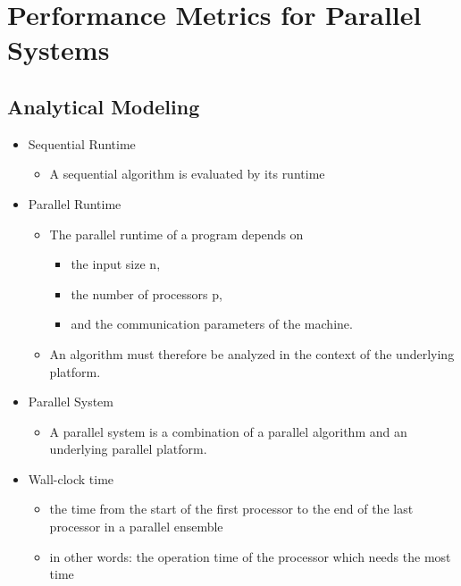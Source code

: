 \hypertarget{performance-metrics-for-parallel-systems}{%
\section{Performance Metrics for Parallel
Systems}\label{performance-metrics-for-parallel-systems}}

\hypertarget{analytical-modeling}{%
\subsection{Analytical Modeling}\label{analytical-modeling}}

\begin{itemize}
\tightlist
\item
  Sequential Runtime

  \begin{itemize}
  \tightlist
  \item
    A sequential algorithm is evaluated by its runtime
  \end{itemize}
\item
  Parallel Runtime

  \begin{itemize}
  \tightlist
  \item
    The parallel runtime of a program depends on

    \begin{itemize}
    \tightlist
    \item
      the input size n,
    \item
      the number of processors p,
    \item
      and the communication parameters of the machine.
    \end{itemize}
  \item
    An algorithm must therefore be analyzed in the context of the
    underlying platform.
  \end{itemize}
\item
  Parallel System

  \begin{itemize}
  \tightlist
  \item
    A parallel system is a combination of a parallel algorithm and an
    underlying parallel platform.
  \end{itemize}
\item
  Wall-clock time

  \begin{itemize}
  \tightlist
  \item
    the time from the start of the first processor to the end of the
    last processor in a parallel ensemble
  \item
    in other words: the operation time of the processor which needs the
    most time
  \end{itemize}
\end{itemize}

